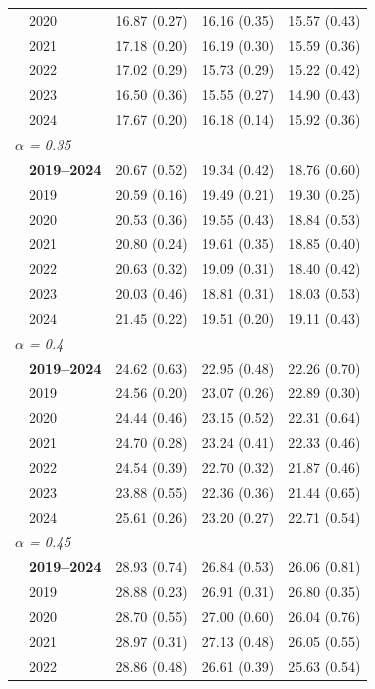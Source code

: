 \begin{table}[htbp]
\begin{tabular}{llrrr}
 & 2020 & 16.87 (0.27) & 16.16 (0.35) & 15.57 (0.43) \\
 & 2021 & 17.18 (0.20) & 16.19 (0.30) & 15.59 (0.36) \\
 & 2022 & 17.02 (0.29) & 15.73 (0.29) & 15.22 (0.42) \\
 & 2023 & 16.50 (0.36) & 15.55 (0.27) & 14.90 (0.43) \\
 & 2024 & 17.67 (0.20) & 16.18 (0.14) & 15.92 (0.36) \\
\midrule
\multicolumn{5}{l}{\textit{$\alpha$ = 0.35}} \\
 & \textbf{2019–2024} & 20.67 (0.52) & 19.34 (0.42) & 18.76 (0.60) \\
 & 2019 & 20.59 (0.16) & 19.49 (0.21) & 19.30 (0.25) \\
 & 2020 & 20.53 (0.36) & 19.55 (0.43) & 18.84 (0.53) \\
 & 2021 & 20.80 (0.24) & 19.61 (0.35) & 18.85 (0.40) \\
 & 2022 & 20.63 (0.32) & 19.09 (0.31) & 18.40 (0.42) \\
 & 2023 & 20.03 (0.46) & 18.81 (0.31) & 18.03 (0.53) \\
 & 2024 & 21.45 (0.22) & 19.51 (0.20) & 19.11 (0.43) \\
\midrule
\multicolumn{5}{l}{\textit{$\alpha$ = 0.4}} \\
 & \textbf{2019–2024} & 24.62 (0.63) & 22.95 (0.48) & 22.26 (0.70) \\
 & 2019 & 24.56 (0.20) & 23.07 (0.26) & 22.89 (0.30) \\
 & 2020 & 24.44 (0.46) & 23.15 (0.52) & 22.31 (0.64) \\
 & 2021 & 24.70 (0.28) & 23.24 (0.41) & 22.33 (0.46) \\
 & 2022 & 24.54 (0.39) & 22.70 (0.32) & 21.87 (0.46) \\
 & 2023 & 23.88 (0.55) & 22.36 (0.36) & 21.44 (0.65) \\
 & 2024 & 25.61 (0.26) & 23.20 (0.27) & 22.71 (0.54) \\
\midrule
\multicolumn{5}{l}{\textit{$\alpha$ = 0.45}} \\
 & \textbf{2019–2024} & 28.93 (0.74) & 26.84 (0.53) & 26.06 (0.81) \\
 & 2019 & 28.88 (0.23) & 26.91 (0.31) & 26.80 (0.35) \\
 & 2020 & 28.70 (0.55) & 27.00 (0.60) & 26.04 (0.76) \\
 & 2021 & 28.97 (0.31) & 27.13 (0.48) & 26.05 (0.55) \\
 & 2022 & 28.86 (0.48) & 26.61 (0.39) & 25.63 (0.54) \\

\end{tabular}
\end{table}
